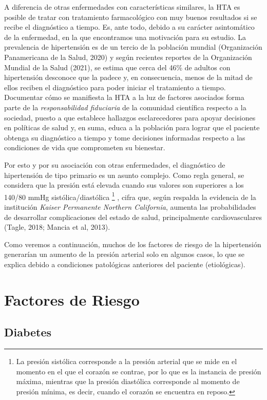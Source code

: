 \documentclass{aa}
\newcounter{daggerfootnote}
\newcommand*{\daggerfootnote}[1]{%
    \setcounter{daggerfootnote}{\value{footnote}}%
    \renewcommand*{\thefootnote}{\fnsymbol{footnote}}%
    \footnote[2]{#1}%
    \setcounter{footnote}{\value{daggerfootnote}}%
    \renewcommand*{\thefootnote}{\arabic{footnote}}%
    }
\begin{document}
A diferencia de otras enfermedades con características similares, la HTA es posible de tratar con tratamiento farmacológico con muy buenos resultados si se recibe el diagnóstico a tiempo. Es, ante todo, debido a su carácter asintomático de la enfermedad, en la que encontramos una motivación para su estudio. La prevalencia de hipertensión es de un tercio de la población mundial (Organización Panamericana de la Salud, 2020) y según recientes reportes de la Organización Mundial de la Salud (2021), se estima que cerca del 46\% de adultos con hipertensión desconoce que la padece y, en consecuencia, menos de la mitad de ellos reciben el diagnóstico para poder iniciar el tratamiento a tiempo. Documentar  cómo se manifiesta la HTA a la luz de factores asociados forma parte de la \textit{responsabilidad fiduciaria} de la comunidad científica respecto a la sociedad, puesto a que establece hallazgos esclarecedores para apoyar decisiones en políticas de salud y, en suma, educa a la población para lograr que el paciente obtenga su diagnóstico a tiempo y tome decisiones informadas respecto a las condiciones de vida que comprometen su bienestar.

Por esto y por su asociación con otras enfermedades, el diagnóstico de hipertensión de tipo primario es un asunto complejo. Como regla general, se considera que la presión está elevada cuando sus valores son superiores a los 140/80 mmHg sistólica/diastólica\daggerfootnote{La presión sistólica corresponde a la presión arterial que se mide en el momento en el que el corazón se contrae, por lo que es la instancia de presión máxima, mientras que la presión diastólica corresponde al momento de presión mínima, es decir, cuando el corazón se encuentra en reposo.}, cifra que, según respalda la evidencia de la institución \textit{Kaiser Permanente Northern California}, aumenta las probabilidades de desarrollar complicaciones del estado de salud, principalmente cardiovasculares (Tagle, 2018; Mancia et al, 2013).

Como veremos a continuación, muchos de los factores de riesgo de la hipertensión generarían un aumento de la presión arterial solo en algunos casos, lo que se explica debido a condiciones patológicas anteriores del paciente (etiológicas).

\section{Factores de Riesgo}

\subsection{Diabetes}
\end{document}
